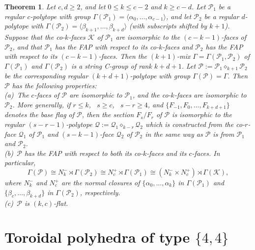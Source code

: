 \documentclass[12pt]{amsart}
\newtheorem{theorem}{Theorem}[section]
\theoremstyle{definition}
\begin{document}
\begin{theorem}
\label{amalprops}
Let $c,d \geq 2$, and let $0 \leq k \leq c-2$ and $k \geq c-d$.  Let $\mathcal{P}_{1}$
be a regular $c$-polytope with group $\Gamma(\mathcal{P}_{1}) = \langle\alpha_{0},\ldots,\alpha_{c-1}\rangle$, and let $\mathcal{P}_{2}$ be a regular $d$-polytope with $\Gamma(\mathcal{P}_{2}) = \langle\beta_{k+1},\ldots,\beta_{k+d}\rangle$ (with subscripts shifted by $k+1$). Suppose that the co-$k$-faces $\mathcal{K}$ of $\mathcal{P}_{1}$ are isomorphic to the $(c-k-1)$-faces of $\mathcal{P}_{2}$, and that $\mathcal{P}_{1}$ has the FAP with respect to its co-$k$-faces and $\mathcal{P}_{2}$ has the FAP with respect to its $(c-k-1)$-faces. Then the $(k+1)$-mix $\Gamma = \Gamma(\mathcal{P}_{1},\mathcal{P}_{2})$ of $\Gamma(\mathcal{P}_{1})$ and $\Gamma(\mathcal{P}_{2})$ is a string C-group of rank $k+d+1$. Let $\mathcal{P} := \mathcal{P}_{1} \diamond_{k+1} \mathcal{P}_{2}$ be the corresponding regular $(k+d+1)$-polytope with group $\Gamma(\mathcal{P}) = \Gamma$. Then $\mathcal{P}$ has the following properties:\\[.02in]
(a)\, The $c$-faces of $\mathcal{P}$ are isomorphic to $\mathcal{P}_{1}$, and the
co-$k$-faces are isomorphic to $\mathcal{P}_{2}$.  More generally, if $r \leq k$, \ 
$s \geq c$, \ $s-r \geq 4$, and $\{F_{-1},F_0,\ldots,F_{k+d+1}\}$ denotes the base flag of $\mathcal{P}$, then the section $F_{s}/F_{r}$ of $\mathcal{P}$ is
isomorphic to the regular $(s-r-1)$-polytope $\mathcal{Q} := \mathcal{Q}_{1} \diamond_{k-r}\mathcal{Q}_{2}$ which is constructed from the co-$r$-face $\mathcal{Q}_{1}$ of $\mathcal{P}_{1}$ and $(s-k-1)$-face $\mathcal{Q}_{2}$ of $\mathcal{P}_{2}$ in the same way as $\mathcal{P}$ is from $\mathcal{P}_{1}$ and $\mathcal{P}_{2}$.\\[.02in]
(b)\, $\mathcal{P}$ has the FAP with respect to both its co-$k$-faces and its
$c$-faces.  In particular,
\[  \Gamma(\mathcal{P}) \cong 
N_{k}^{-} \rtimes \Gamma(\mathcal{P}_{2}) \cong
N_{c}^{+} \rtimes \Gamma(\mathcal{P}_{1}) \cong 
(N_{k}^{-} \times N_{c}^{+}) \rtimes \Gamma(\mathcal{K}),  \]
where $N_{k}^{-}$ and $N_{c}^{+}$ are the normal closures of 
$\{\alpha_{0},\ldots,\alpha_{k}\}$ in $\Gamma(\mathcal{P}_{1})$ and 
$\{\beta_{c},\ldots,\beta_{k+d}\}$ in $\Gamma(\mathcal{P}_{2})$, respectively.\\[.02in]
(c)\, $\mathcal{P}$ is $(k,c)$-flat.
\end{theorem}

\section{Toroidal polyhedra of type $\{4,4\}$}
\label{44type}
\end{document}
